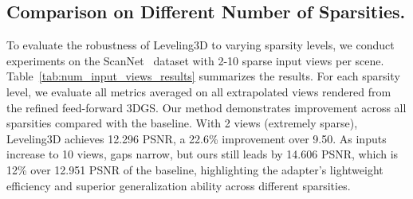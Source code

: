
% 


\subsection{Comparison on Different Number of Sparsities.} To evaluate the robustness of Leveling3D to varying sparsity levels, we conduct experiments on the ScanNet~\cite{dai2017scannet} dataset with 2-10 sparse input views per scene. Table~\ref{tab:num_input_views_results} summarizes the results. For each sparsity level, we evaluate all metrics averaged on all extrapolated views rendered from the refined feed-forward 3DGS. Our method demonstrates improvement across all sparsities compared with the baseline. With 2 views (extremely sparse), Leveling3D achieves 12.296 PSNR, a 22.6\% improvement over 9.50. As inputs increase to 10 views, gaps narrow, but ours still leads by 14.606 PSNR, which is 12\% over 12.951 PSNR of the baseline, highlighting the adapter's lightweight efficiency and superior generalization ability across different sparsities.






% 

% 







